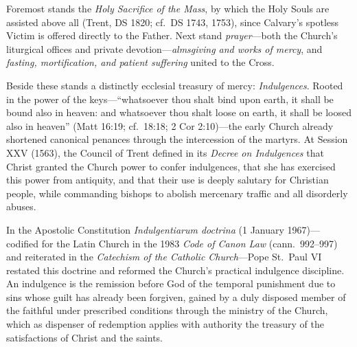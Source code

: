 Foremost stands the \textit{Holy Sacrifice of the Mass}, by which the Holy Souls are assisted above all (Trent, DS 1820; cf.\ DS 1743, 1753), since Calvary's spotless Victim is offered directly to the Father. Next stand \textit{prayer}---both the Church's liturgical offices and private devotion---\textit{almsgiving and works of mercy}, and \textit{fasting, mortification, and patient suffering} united to the Cross.

Beside these stands a distinctly ecclesial treasury of mercy: \textit{Indulgences}. Rooted in the power of the keys---``whatsoever thou shalt bind upon earth, it shall be bound also in heaven: and whatsoever thou shalt loose on earth, it shall be loosed also in heaven'' (Matt 16:19; cf.\ 18:18; 2 Cor 2:10)---the early Church already shortened canonical penances through the intercession of the martyrs. At Session XXV (1563), the Council of Trent defined in its \textit{Decree on Indulgences} that Christ granted the Church power to confer indulgences, that she has exercised this power from antiquity, and that their use is deeply salutary for Christian people, while commanding bishops to abolish mercenary traffic and all disorderly abuses.

In the Apostolic Constitution \textit{Indulgentiarum doctrina} (1 January 1967)---codified for the Latin Church in the 1983 \textit{Code of Canon Law} (cann.\ 992--997) and reiterated in the \textit{Catechism of the Catholic Church}---Pope St.\ Paul VI restated this doctrine and reformed the Church's practical indulgence discipline. An indulgence is the remission before God of the temporal punishment due to sins whose guilt has already been forgiven, gained by a duly disposed member of the faithful under prescribed conditions through the ministry of the Church, which as dispenser of redemption applies with authority the treasury of the satisfactions of Christ and the saints.


